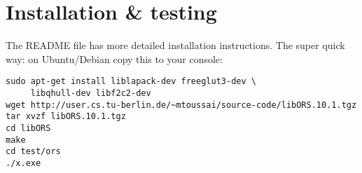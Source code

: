 
\lectureNote
\pdflatex

\usepackage{boxedminipage}

  \usepackage{listings}


\newcommand{\pwd}{}
\newcommand{\cmd}[1]{\lstinline$#1$}
\newcommand{\file}[1]{\href{\pwd/../#1}{\nolinkurl{#1}}}
\newcommand{\namespace}[1]{\href{\pwd/html/namespace#1.html}{\nolinkurl{#1}}}
\newcommand{\source}[2]{\href{\pwd/html/#1_8#2-source.html}{\nolinkurl{#1.#2}}}
\newcommand{\struct}[2]{\href{\pwd/html/struct#1_1_1#2.html}{\nolinkurl{#1::#2}}}
\newcommand{\method}[3]{\href{\pwd/html/struct#1_1_1#2.html}{\nolinkurl{#1::#2::#3}}}
\newcommand{\function}[2]{\href{\pwd/html/namespace#1.html}{\nolinkurl{#1::#2}}}




\maketitle

\tableofcontents

\section{Installation \& testing}

The README file has more detailed installation instructions. The super
quick way: on Ubuntu/Debian copy this to your console:
\begin{code}
\begin{verbatim}
sudo apt-get install liblapack-dev freeglut3-dev \
     libqhull-dev libf2c2-dev
wget http://user.cs.tu-berlin.de/~mtoussai/source-code/libORS.10.1.tgz
tar xvzf libORS.10.1.tgz
cd libORS
make
cd test/ors
./x.exe
\end{verbatim}
\end{code}

